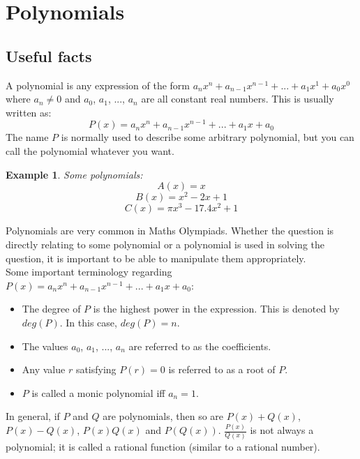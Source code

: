 \documentclass[a4paper,12pt]{article}
\newtheorem{example}{Example}[section]
\begin{document}
\clearpage
\section{Polynomials}

\subsection{Useful facts}

A polynomial is any expression of the form $a_nx^n + a_{n - 1}x^{n - 1} + ... + a_1x^1 + a_0x^0$ where $a_n \neq 0$ and $a_0$, $a_1$, ..., $a_n$ are all constant real numbers. This is usually written as:
$$P(x) = a_nx^n + a_{n - 1}x^{n - 1} + ... + a_1x + a_0$$
The name $P$ is normally used to describe some arbitrary polynomial, but you can call the polynomial whatever you want.

\begin{example} Some polynomials:
    $$A(x) = x$$
    $$B(x) = x^2 - 2x + 1$$
    $$C(x) = \pi x^3 - 17.4x^2 + 1$$
\end{example}

Polynomials are very common in Maths Olympiads. Whether the question is directly relating to some polynomial or a polynomial is used in solving the question, it is important to be able to manipulate them appropriately. \\

Some important terminology regarding $P(x) = a_nx^n + a_{n - 1}x^{n - 1} + ... + a_1x + a_0$:
\begin{itemize}

\item The degree of $P$ is the highest power in the expression. This is denoted by $deg(P)$. In this case, $deg(P) = n$.

\item The values $a_0$, $a_1$, ..., $a_n$ are referred to as the coefficients.

\item Any value $r$ satisfying $P(r) = 0$ is referred to as a root of $P$.

\item $P$ is called a monic polynomial iff $a_n = 1$.

\end{itemize}

In general, if $P$ and $Q$ are polynomials, then so are $P(x) + Q(x)$, $P(x) - Q(x)$, $P(x)Q(x)$ and $P(Q(x))$. $\frac{P(x)}{Q(x)}$ is not always a polynomial; it is called a rational function (similar to a rational number). \\
\end{document}

